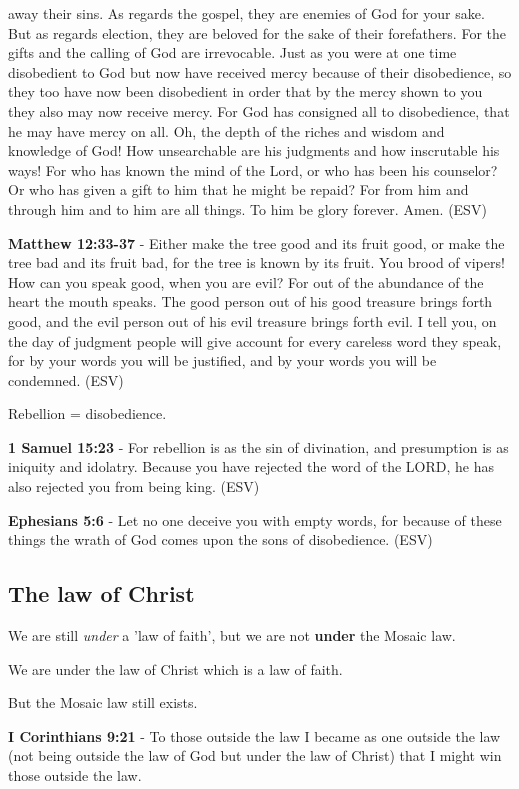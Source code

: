 \documentclass[11pt]{article}
\begin{document}
away their sins. As regards the gospel, they are enemies of God for your sake. But as regards election, they are beloved for the sake of their forefathers. For the gifts and the calling of God are irrevocable. Just as you were at one time disobedient to God but now have received mercy because of their disobedience, so they too have now been disobedient in order that by the mercy shown to you they also may now receive mercy. For God has consigned all to disobedience, that he may have mercy on all. Oh, the depth of the riches and wisdom and knowledge of God! How unsearchable are his judgments and how inscrutable his ways! For who has known the mind of the Lord, or who has been his counselor? Or who has given a gift to him that he might be repaid? For from him and through him and to him are all things. To him be glory forever. Amen. (ESV)

\textbf{Matthew 12:33-37} - Either make the tree good and its fruit good, or make the tree bad and its fruit bad, for the tree is known by its fruit. You brood of vipers! How can you speak good, when you are evil? For out of the abundance of the heart the mouth speaks. The good person out of his good treasure brings forth good, and the evil person out of his evil treasure brings forth evil. I tell you, on the day of judgment people will give account for every careless word they speak, for by your words you will be justified, and by your words you will be condemned. (ESV)

Rebellion = disobedience.

\textbf{1 Samuel 15:23} - For rebellion is as the sin of divination, and presumption is as iniquity and idolatry. Because you have rejected the word of the LORD, he has also rejected you from being king. (ESV)

\textbf{Ephesians 5:6} - Let no one deceive you with empty words, for because of these things the wrath of God comes upon the sons of disobedience. (ESV)

\subsection{The law of Christ}
\label{sec:orgcd17f8f}
We are still \emph{under} a 'law of faith', but we are not \textbf{under} the Mosaic law.

We are under the law of Christ which is a law of faith.

But the Mosaic law still exists.

\textbf{I Corinthians 9:21} - To those outside the law I became as one outside the law (not being outside the law of God but under the law of Christ) that I might win those outside the law.
\end{document}

